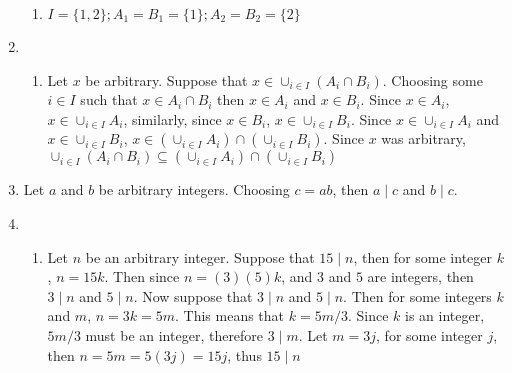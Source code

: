 \begin{enumerate}
\begin{enumerate}
        \item 
    $I=\{1,2\}; A_1 = B_1 = \{1\}; A_2 = B_2 = \{2\}$
    \end{enumerate}
    \item
    \begin{enumerate}
        \item 
    Let $x$ be arbitrary. Suppose that $x \in \cup_{i \in I}(A_i \cap B_i)$. Choosing some $i \in I$ such that $x \in A_i \cap B_i$ then $x \in A_i$ and $x \in B_i$. Since $x \in A_i$, $x \in \cup_{i \in I} A_i$, similarly, since $x \in B_i$, $x \in \cup_{i \in I} B_i$. Since $x \in \cup_{i \in I} A_i$ and $x \in \cup_{i \in I} B_i$, $x \in (\cup_{i \in I} A_i) \cap (\cup_{i \in I} B_i)$. Since $x$ was arbitrary, $\cup_{i \in I}(A_i \cap B_i) \subseteq (\cup_{i \in I} A_i) \cap (\cup_{i \in I} B_i)$
    \end{enumerate}
    \item
    Let $a$ and $b$ be arbitrary integers. Choosing $c = ab$, then $a \mid c$ and $b \mid c$.
    \item
    \begin{enumerate}
        \item 
    Let $n$ be an arbitrary integer. Suppose that $15 \mid n$, then for some integer $k$, $n = 15k$.
    Then since $n = (3)(5)k$, and $3$ and $5$ are integers, then $3 \mid n$ and $5 \mid n$.
    Now suppose that $3 \mid n$ and $5 \mid n$. Then for some integers $k$and $m$, $n = 3k = 5m$. This means that $k = 5m / 3$. Since $k$ is an integer, $5m / 3$ must be an integer, therefore $3 \mid m$. Let $m = 3j$, for some integer $j$, then $n = 5m = 5(3j) = 15j$, thus $15 \mid n$
    \end{enumerate}
    
\end{enumerate}
